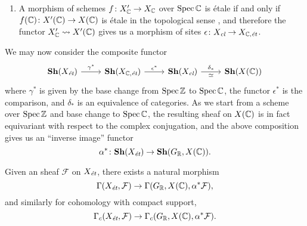 \documentclass{article}
\numberwithin{equation}{section}
\begin{document}
\begin{appendices}
\begin{enumerate}
  Let $X_\text{\it cl}$\footnote{``cl'' for ``classique''.} be the site of étale
  maps $f\colon U\to X (\CC)$. A covering family in $X_\text{\it cl}$ is a
  family of maps $\{ U_i \to U \}$ such that $U$ is the union of images of
  $U_i$.

  As the inclusion of an open subset $U \subset X (\CC)$ is trivially an étale
  map, we have a fully faithful functor $X (\CC) \subset X_\text{\it cl}$, and
  the topology on $X (\CC)$ is induced by the topology on
  $X_\text{\it cl}$. This gives us a morphism of sites
  $\delta\colon X_\text{\it cl} \to X (\CC)$,
  which by the well-known ``comparison lemma''
  \cite[Exposé~III, Théorème~4.1]{SGA4} induces an equivalence of the
  corresponding categories of sheaves
  $\delta_*\colon \mathbf{Sh} (X_\text{\it cl}) \to \mathbf{Sh} (X (\CC))$.

\item A morphism of schemes $f\colon X'_\CC \to X_\CC$ over $\Spec \CC$ is étale
  if and only if $f (\CC)\colon X' (\CC) \to X (\CC)$ is étale in the
  topological sense \cite[Exposé~XII, Proposition~3.1]{SGA1}, and therefore the
  functor $X'_\CC \rightsquigarrow X' (\CC)$ gives us a morphism of sites
  $\epsilon\colon X_\text{\it cl} \to X_{\CC,\text{\it ét}}$.
\end{enumerate}

We may now consider the composite functor
\[ \begin{tikzcd}
  \mathbf{Sh} (X_\et) \ar{r}{\gamma^*} &
  \mathbf{Sh} (X_{\CC,\text{\it ét}}) \ar{r}{\epsilon^*} &
  \mathbf{Sh} (X_\text{\it cl}) \ar{r}{\delta_*}[swap]{\simeq} &
  \mathbf{Sh} (X (\CC))
\end{tikzcd} \]
where $\gamma^*$ is given by the base change from $\Spec \ZZ$ to $\Spec \CC$,
the functor $\epsilon^*$ is the comparison, and $\delta_*$ is an equivalence of
categories. As we start from a scheme over $\Spec \ZZ$ and base change to
$\Spec \CC$, the resulting sheaf on $X (\CC)$ is in fact equivariant with
respect to the complex conjugation, and the above composition gives us an
``inverse image'' functor
$$\alpha^*\colon \mathbf{Sh} (X_\et) \to \mathbf{Sh} (G_\RR, X (\CC)).$$

\begin{proposition}
  \label{prop:inverse-image-gamma}
  Given an sheaf $\mathcal{F}$ on $X_\et$, there exists a natural morphism
  $$\Gamma (X_\et, \mathcal{F}) \to \Gamma (G_\RR, X (\CC), \alpha^* \mathcal{F}),$$
  and similarly for cohomology with compact support,
  $$\Gamma_c (X_\et, \mathcal{F}) \to \Gamma_c (G_\RR, X (\CC), \alpha^* \mathcal{F}).$$


\end{proposition}
\end{appendices}
\end{document}
